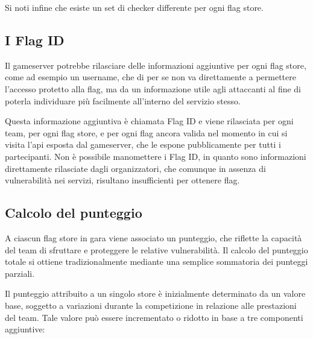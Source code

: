 Si noti infine che esiste un set di checker differente per ogni flag store.

\subsection{I Flag ID}

Il gameserver potrebbe rilasciare delle informazioni aggiuntive per ogni flag store, come ad esempio un username, che di per se non va direttamente a permettere l'accesso protetto alla flag, ma da un informazione utile agli attaccanti al fine di poterla individuare più facilmente all'interno del servizio stesso.

Questa informazione aggiuntiva è chiamata Flag ID e viene rilasciata per ogni team, per ogni flag store, e per ogni flag ancora valida nel momento in cui si visita l'\gls{api} esposta dal gameserver, che le espone pubblicamente per tutti i partecipanti. Non è possibile manomettere i Flag ID, in quanto sono informazioni direttamente rilasciate dagli organizzatori, che comunque in assenza di vulnerabilità nei servizi, risultano insufficienti per ottenere flag.

\subsection{Calcolo del punteggio}

A ciascun flag store in gara viene associato un punteggio, che riflette la capacità del team di sfruttare e proteggere le relative vulnerabilità. Il calcolo del punteggio totale si ottiene tradizionalmente mediante una semplice sommatoria dei punteggi parziali.

Il punteggio attribuito a un singolo store è inizialmente determinato da un valore base, soggetto a variazioni durante la competizione in relazione alle prestazioni del team. Tale valore può essere incrementato o ridotto in base a tre componenti aggiuntive:

